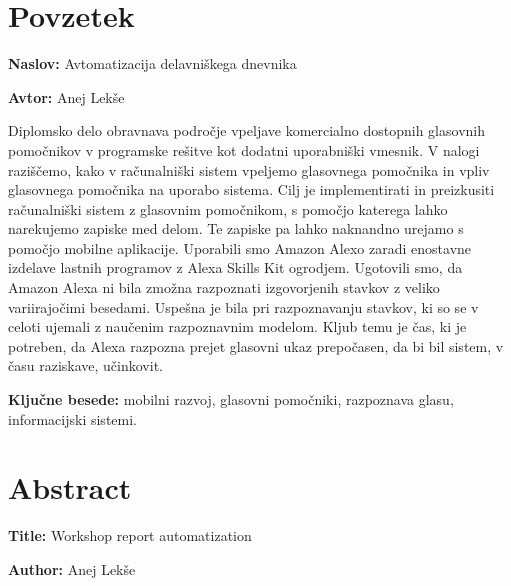 \documentclass[a4paper, 12pt]{book}
\newcommand{\ttitle}{Avtomatizacija delavniškega dnevnika}
\newcommand{\ttitleEn}{Workshop report automatization}
\newcommand{\tauthor}{Anej Lekše}
\newcommand{\tkeywords}{mobilni razvoj, glasovni pomočniki, razpoznava glasu, informacijski sistemi}
\newcommand{\clearemptydoublepage}{\newpage{\pagestyle{empty}\cleardoublepage}}
\begin{document}
\chapter*{Povzetek}

\noindent\textbf{Naslov:} \ttitle
\bigskip

\noindent\textbf{Avtor:} \tauthor
\bigskip


\noindent Diplomsko delo obravnava področje vpeljave komercialno dostopnih glasovnih pomočnikov v programske rešitve kot dodatni uporabniški vmesnik.
V nalogi raziščemo, kako v računalniški sistem vpeljemo glasovnega pomočnika in vpliv glasovnega pomočnika na uporabo sistema.
Cilj je implementirati in preizkusiti računalniški sistem z glasovnim pomočnikom, s pomočjo katerega lahko narekujemo zapiske med delom. 
Te zapiske pa lahko naknandno urejamo s pomočjo mobilne aplikacije.
Uporabili smo Amazon Alexo zaradi enostavne izdelave lastnih programov z Alexa Skills Kit ogrodjem.
Ugotovili smo, da Amazon Alexa ni bila zmožna razpoznati izgovorjenih stavkov z veliko variirajočimi besedami.
Uspešna je bila pri razpoznavanju stavkov, ki so se v celoti ujemali z naučenim razpoznavnim modelom.
Kljub temu je čas, ki je potreben, da Alexa razpozna prejet glasovni ukaz prepočasen, da bi bil sistem, v času raziskave, učinkovit.
\bigskip

\noindent\textbf{Ključne besede:} \tkeywords.
\clearemptydoublepage

\chapter*{Abstract}

\noindent\textbf{Title:} \ttitleEn
\bigskip

\noindent\textbf{Author:} \tauthor
\bigskip
\end{document}
